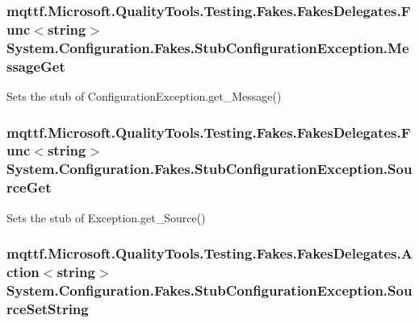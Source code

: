 \hypertarget{class_system_1_1_configuration_1_1_fakes_1_1_stub_configuration_exception_ad62f9cb28d83314fdd3ef7dd2bca9758}{
\subsubsection[{Message\-Get}]{\setlength{\rightskip}{0pt plus 5cm}mqttf.\-Microsoft.\-Quality\-Tools.\-Testing.\-Fakes.\-Fakes\-Delegates.\-Func$<$string$>$ System.\-Configuration.\-Fakes.\-Stub\-Configuration\-Exception.\-Message\-Get}}\label{class_system_1_1_configuration_1_1_fakes_1_1_stub_configuration_exception_ad62f9cb28d83314fdd3ef7dd2bca9758}


Sets the stub of Configuration\-Exception.\-get\-\_\-\-Message()

\hypertarget{class_system_1_1_configuration_1_1_fakes_1_1_stub_configuration_exception_a169ffec806dab635a5c2c4f8af8c1fd9}{
\subsubsection[{Source\-Get}]{\setlength{\rightskip}{0pt plus 5cm}mqttf.\-Microsoft.\-Quality\-Tools.\-Testing.\-Fakes.\-Fakes\-Delegates.\-Func$<$string$>$ System.\-Configuration.\-Fakes.\-Stub\-Configuration\-Exception.\-Source\-Get}}\label{class_system_1_1_configuration_1_1_fakes_1_1_stub_configuration_exception_a169ffec806dab635a5c2c4f8af8c1fd9}


Sets the stub of Exception.\-get\-\_\-\-Source()

\hypertarget{class_system_1_1_configuration_1_1_fakes_1_1_stub_configuration_exception_ad22b2e51aede12e20681eb346b48b1ee}{
\subsubsection[{Source\-Set\-String}]{\setlength{\rightskip}{0pt plus 5cm}mqttf.\-Microsoft.\-Quality\-Tools.\-Testing.\-Fakes.\-Fakes\-Delegates.\-Action$<$string$>$ System.\-Configuration.\-Fakes.\-Stub\-Configuration\-Exception.\-Source\-Set\-String}}\label{class_system_1_1_configuration_1_1_fakes_1_1_stub_configuration_exception_ad22b2e51aede12e20681eb346b48b1ee}


